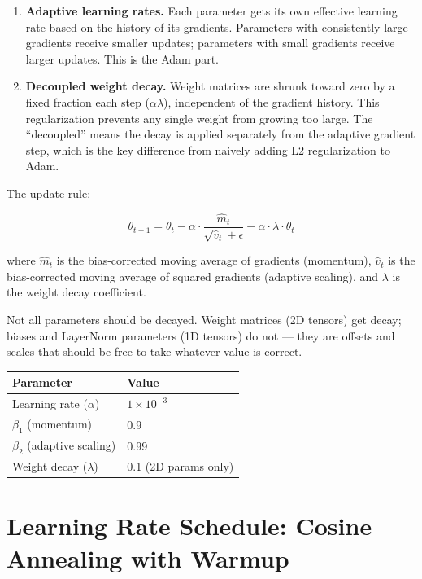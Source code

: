 \begin{enumerate}
  \item \textbf{Adaptive learning rates.} Each parameter gets its own effective learning rate based on the history of its gradients. Parameters with consistently large gradients receive smaller updates; parameters with small gradients receive larger updates. This is the Adam part.
  \item \textbf{Decoupled weight decay.} Weight matrices are shrunk toward zero by a fixed fraction each step ($\alpha \lambda$), independent of the gradient history. This regularization prevents any single weight from growing too large. The ``decoupled'' means the decay is applied separately from the adaptive gradient step, which is the key difference from naively adding L2 regularization to Adam.
\end{enumerate}

The update rule:

\[\theta_{t+1} = \theta_t - \alpha \cdot \frac{\hat{m}_t}{\sqrt{\hat{v}_t} + \epsilon} - \alpha \cdot \lambda \cdot \theta_t\]

where $\hat{m}_t$ is the bias-corrected moving average of gradients (momentum), $\hat{v}_t$ is the bias-corrected moving average of squared gradients (adaptive scaling), and $\lambda$ is the weight decay coefficient.

Not all parameters should be decayed. Weight matrices (2D tensors) get decay; biases and LayerNorm parameters (1D tensors) do not --- they are offsets and scales that should be free to take whatever value is correct.

\begin{center}
\begin{tabular}{ll}
\toprule
Parameter & Value \\
\midrule
Learning rate ($\alpha$) & $1 \times 10^{-3}$ \\
$\beta_1$ (momentum) & 0.9 \\
$\beta_2$ (adaptive scaling) & 0.99 \\
Weight decay ($\lambda$) & 0.1 (2D params only) \\
\bottomrule
\end{tabular}
\end{center}

\section{Learning Rate Schedule: Cosine Annealing with Warmup}

